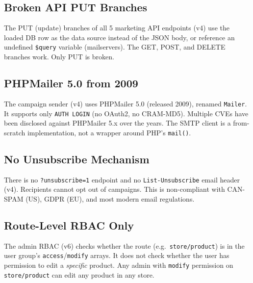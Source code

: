 \documentclass[11pt,a4paper]{article}
\begin{document}
\subsection{Broken API PUT Branches}

\begin{badbox}
The PUT (update) branches of all 5 marketing API endpoints (v4) use
the loaded DB row as the data source instead of the JSON body, or
reference an undefined \texttt{\$query} variable (mailservers). The
GET, POST, and DELETE branches work. Only PUT is broken.
\end{badbox}

\subsection{PHPMailer 5.0 from 2009}

\begin{badbox}
The campaign sender (v4) uses PHPMailer 5.0 (released 2009), renamed
\texttt{Mailer}. It supports only \texttt{AUTH LOGIN} (no OAuth2, no
CRAM-MD5). Multiple CVEs have been disclosed against PHPMailer 5.x
over the years. The SMTP client is a from-scratch implementation,
not a wrapper around PHP's \texttt{mail()}.
\end{badbox}

\subsection{No Unsubscribe Mechanism}

\begin{badbox}
There is no \texttt{?unsubscribe=1} endpoint and no
\texttt{List-Unsubscribe} email header (v4). Recipients cannot
opt out of campaigns. This is non-compliant with CAN-SPAM (US),
GDPR (EU), and most modern email regulations.
\end{badbox}

\subsection{Route-Level RBAC Only}

\begin{badbox}
The admin RBAC (v6) checks whether the route (e.g.\ \texttt{store/product})
is in the user group's \texttt{access}/\texttt{modify} arrays. It does
not check whether the user has permission to edit a \emph{specific}
product. Any admin with \texttt{modify} permission on
\texttt{store/product} can edit any product in any store.
\end{badbox}
\end{document}
